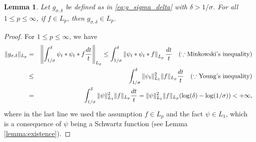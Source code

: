 \documentclass[11pt]{article}
\newtheorem{lemma}[theorem]{Lemma}
\theoremstyle{remark}
\theoremstyle{example}
\theoremstyle{remark}
\begin{document}
\begin{lemma} \label{lemma:g_sigma_L1L2}
Let $g_{\sigma,\delta}$ be defined as in \eqref{eq:g_sigma_delta} with $\delta > 1/\sigma$.
For all $1 \leq p \leq \infty$, if $f\in L_p$, then $g_{\sigma,\delta} \in L_p$. %
\end{lemma}
\begin{proof}
For $1 \leq p \leq \infty$, we have
\begin{eqnarray*}
\| g_{\sigma, \delta} \|_{L_p} 
&=&  \left\Vert   \int_{1/\sigma}^\delta {\psi}_t * \psi_t * f \frac{dt}{t} \right\Vert_{L_p} 
\leq  \int_{1/\sigma}^\delta  \left\Vert   {\psi}_t * \psi_t * f  \right\Vert_{L_p}   \frac{dt}{t} \quad (\because {\rm Minkowski\mathchar`'s\ inequality})  \\ 
&\le&   \int_{1/\sigma}^\delta \| \psi_t \|_{L_1}^2 \| f \|_{L_p} \frac{dt}{t}  \quad (\because {\rm Young\mathchar`'s\ inequality})  \\ 
&=&   \int_{1/\sigma}^\delta \| \psi \|_{L_1}^2 \| f \|_{L_p} \frac{dt}{t} = \| \psi \|_{L_1}^2 \| f \|_{L_p} (\log(\delta) - \log(1/\sigma)) < + \infty, \nonumber
\end{eqnarray*}
where in the last line we used the assumption $f \in L_p$ and the fact $\psi \in L_1$, which is a consequence of $\psi$ being a Schwartz function (see Lemma \ref{lemma:existence}). 
\end{proof}
\end{document}
